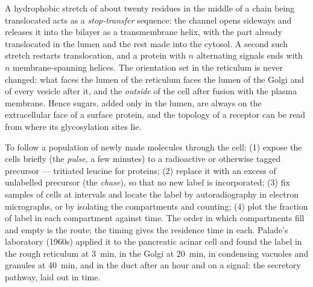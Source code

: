 \begin{proposition}\label{prop:b3:membrane-traffic:topology}
A hydrophobic stretch of about twenty residues in the middle of a
chain being translocated acts as a \emph{stop-transfer} sequence: the
channel opens sideways and releases it into the bilayer as a
transmembrane helix, with the part already translocated in the lumen
and the rest made into the cytosol. A second such stretch restarts
translocation, and a protein with $n$ alternating signals ends with
$n$ membrane-spanning helices. The orientation set in the reticulum is
never changed: what faces the lumen of the reticulum faces the lumen of
the Golgi and of every vesicle after it, and the \emph{outside} of the
cell after fusion with the plasma membrane. Hence sugars, added only in
the lumen, are always on the extracellular face of a surface protein,
and the topology of a receptor can be read from where its glycosylation
sites lie.
\end{proposition}

\begin{method}\label{met:b3:membrane-traffic:pulse-chase}
To follow a population of newly made molecules through the cell: (1)
expose the cells briefly (the \emph{pulse}, a few minutes) to a
radioactive or otherwise tagged precursor --- tritiated leucine for
proteins; (2) replace it with an excess of unlabelled precursor (the
\emph{chase}), so that no new label is incorporated; (3) fix samples of
cells at intervals and locate the label by autoradiography in electron
micrographs, or by isolating the compartments and counting; (4) plot
the fraction of label in each compartment against time. The order in
which compartments fill and empty is the route; the timing gives the
residence time in each. Palade's laboratory (1960s) applied it to the
pancreatic acinar cell and found the label in the rough reticulum at
\qty{3}{min}, in the Golgi at \qty{20}{min}, in condensing vacuoles and
granules at \qty{40}{min}, and in the duct after an hour and on a
signal: the secretory pathway, laid out in time.
\end{method}

